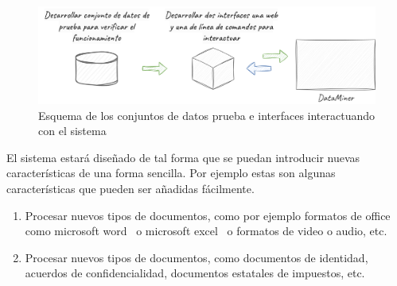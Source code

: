 \begin{figure}[ht]
    \begin{center}
        \includegraphics[width=\textwidth]{chapter/1/images/chapter_1.specific_b}
        \caption{Esquema de los conjuntos de datos prueba e interfaces interactuando con el sistema}
        \label{fig:chapter_1.specific_b}
    \end{center}
\end{figure}

El sistema estará diseñado de tal forma que se puedan introducir nuevas características de una forma sencilla.
Por ejemplo estas son algunas características que pueden ser añadidas fácilmente.

\begin{enumerate}
    \item
    Procesar nuevos tipos de documentos, como por ejemplo formatos de office como microsoft
    word~\cite{url_microsoft_word} o microsoft excel~\cite{url_microsoft_excel} o formatos de video o audio, etc.

    \item
    Procesar nuevos tipos de documentos, como documentos de identidad, acuerdos de confidencialidad, documentos
    estatales de impuestos, etc.
\end{enumerate}
